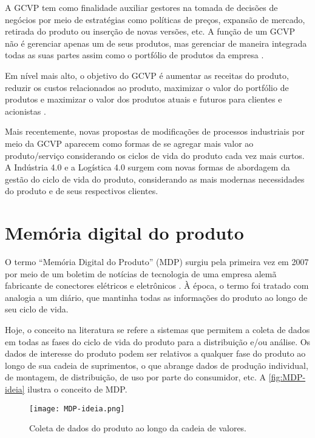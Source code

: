 	A GCVP tem como finalidade auxiliar gestores na tomada de decisões de negócios por meio de estratégias como políticas de preços, expansão de mercado, retirada do produto ou inserção de novas versões, etc. A função de um GCVP não é gerenciar apenas um de seus produtos, mas gerenciar de maneira integrada todas as suas partes assim como o portfólio de produtos da empresa \cite{stark2015lifecycle}.
	
	Em nível mais alto, o objetivo do GCVP é aumentar as receitas do produto, reduzir os custos relacionados ao produto, maximizar o valor do portfólio de produtos e maximizar o valor dos produtos atuais e futuros para clientes e acionistas \cite{stark2015lifecycle}.
	
	Mais recentemente, novas propostas de modificações de processos industriais por meio da GCVP aparecem como formas de se agregar mais valor ao produto/serviço considerando os ciclos de vida do produto cada vez mais curtos. A Indústria 4.0 e a Logística 4.0 surgem com novas formas de abordagem da gestão do ciclo de vida do produto, considerando as mais modernas necessidades do produto e de seus respectivos clientes.

\section{Memória digital do produto}

	O termo ``Memória Digital do Produto'' (MDP) surgiu pela primeira vez em 2007 por meio de um boletim de notícias de tecnologia de uma empresa alemã fabricante de conectores elétricos e eletrônicos \cite{wahlster2007digitalmemory}. À época, o termo foi tratado com analogia a um diário, que mantinha todas as informações do produto ao longo de seu ciclo de vida.
	
	Hoje, o conceito na literatura se refere a sistemas que permitem a coleta de dados em todas as fases do ciclo de vida do produto para a distribuição e/ou análise. Os dados de interesse do produto podem ser relativos a qualquer fase do produto ao longo de sua cadeia de suprimentos, o que abrange dados de produção individual, de montagem, de distribuição, de uso por parte do consumidor, etc. A \autoref{fig:MDP-ideia} ilustra o conceito de MDP.
	
	\begin{figure}[htb]
		\centering
		\caption{Coleta de dados do produto ao longo da cadeia de valores.}
		\label{fig:MDP-ideia}
		\texttt{[image: MDP-ideia.png]}
	\end{figure}
	
